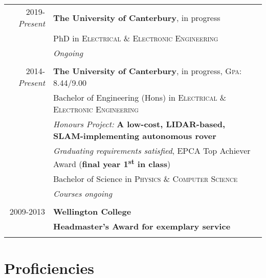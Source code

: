 \documentclass[a4paper,10pt]{article} %
\begin{document}
\begin{tabular}{r|l}	

2019-\emph{Present} & \normalsize \textbf{The University of Canterbury}, in progress \\
& PhD in \textsc{Electrical \& Electronic Engineering} \\
& \quad \small\emph{Ongoing} \\
\multicolumn{2}{c}{} \\

2014-\emph{Present} & \normalsize \textbf{The University of Canterbury}, in progress, \normalsize \textsc{Gpa}: 8.44/9.00 \\
& Bachelor of Engineering (Hons) in \textsc{Electrical \& Electronic Engineering} \\
& \quad \small\emph{Honours Project:} \textbf{A low-cost, LIDAR-based, SLAM-implementing autonomous rover} \\
& \quad \small\emph{Graduating requirements satisfied}, EPCA Top Achiever Award (\textbf{final year 1\textsuperscript{st} in class}) \\
& Bachelor of Science in \textsc{Physics \& Computer Science} \\
& \quad \small\emph{Courses ongoing} \\
\multicolumn{2}{c}{} \\

2009-2013 & \normalsize \textbf{Wellington College} \\
& \small\textbf{Headmaster's Award for exemplary service} \\
\multicolumn{2}{c}{} \\


\end{tabular}








\section{Proficiencies}
\end{document}
